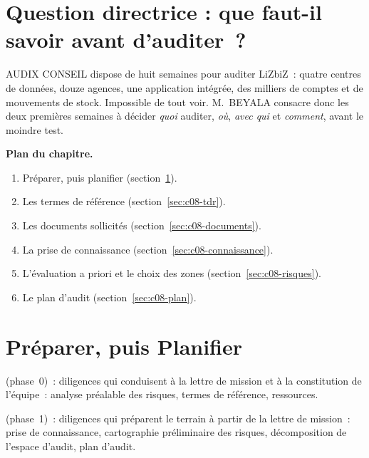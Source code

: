 \bigskip

\section*{Question directrice : que faut-il savoir avant d'auditer~?}

AUDIX CONSEIL dispose de huit semaines pour auditer LiZbiZ~: quatre
centres de données, douze agences, une application intégrée, des milliers
de comptes et de mouvements de stock. Impossible de tout voir. M.~BEYALA
consacre donc les deux premières semaines à décider \emph{quoi} auditer,
\emph{où}, \emph{avec qui} et \emph{comment}, avant le moindre test.

\medskip
\textbf{Plan du chapitre.}
\begin{enumerate}
    \item Préparer, puis planifier (section~\ref{sec:c08-deux-phases}).
    \item Les termes de référence (section~\ref{sec:c08-tdr}).
    \item Les documents sollicités (section~\ref{sec:c08-documents}).
    \item La prise de connaissance (section~\ref{sec:c08-connaissance}).
    \item L'évaluation a priori et le choix des zones
          (section~\ref{sec:c08-risques}).
    \item Le plan d'audit (section~\ref{sec:c08-plan}).
\end{enumerate}

\separateur

\section{Préparer, puis Planifier}
\label{sec:c08-deux-phases}

\begin{boxdef}
 (phase~0)~:
diligences qui conduisent à la lettre de mission et à la constitution de
l'équipe~: analyse préalable des risques, termes de référence, ressources.

\medskip
{} (phase~1)~: diligences qui
préparent le terrain à partir de la lettre de mission~: prise de
connaissance, cartographie préliminaire des risques, décomposition de
l'espace d'audit, plan d'audit.
\end{boxdef}

